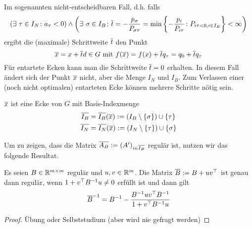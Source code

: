 Im sogenannten nicht-entscheidbaren Fall, d.h. falls
\begin{equation*}
	\left( \exists \ \tau \in I_N \colon a_\tau < 0 \right) \land \left(  \exists \ \sigma \in I_B \colon \overline{t} = -\frac{p_\sigma}{P_{\sigma \tau}} = \min \left\{ -\frac{p_i}{P_{i \tau}} \colon P_{i \tau < 0, i \in I_B} \right\} < \infty \right)
\end{equation*}
ergibt die (maximale) Schrittweite $\overline{t}$ den Punkt
\begin{equation*}
	\overline{x} = x + \overline{t} d \in G \text{ mit } f(\overline{x}) = f(x) + \overline{t} q_\tau = q_0 + \overline{t} q_\tau
\end{equation*}
Für entartete Ecken kann man die Schrittweite $\overline{t} = 0$ erhalten. In diesem Fall ändert sich der Punkt $\overline{x}$ nicht, aber die Menge $I_N$ und $I_B$. Zum Verlassen einer (noch nicht optimalen) entarteten Ecke können mehrere Schritte nötig sein. 

\begin{satz} %
	\label{satz: 3.6}
	$\overline{x}$ ist eine Ecke von $G$ mit Basis-Indexmenge
	\begin{equation*}
		\begin{aligned}
			\overline{I_B} &= \overline{I_B}(\overline{x}) \mathrel{:=} \left( I_B \setminus \left\{ \sigma \right\} \right) \cup \left\{ \tau \right\} \\
			\overline{I_N} &= \overline{I_N}(\overline{x}) \mathrel{:=} \left( I_N \setminus \left\{ \tau \right\} \right) \cup \left\{ \sigma \right\}
		\end{aligned}
	\end{equation*}
\end{satz}

Um zu zeigen, dass die Matrix $\overline{A_B} \mathrel{:=} (A')_{i \in \overline{I_B}}$ regulär ist, nutzen wir das folgende Resultat.

\begin{lemma} %
	\label{lemma: 3.7}
	Es seien $B \in \mathbb{R}^{m \times m}$ regulär und $u,v \in \mathbb{R}^m$. Die Matrix $\overline{B} \mathrel{:=} B + u v^{\top}$ ist genau dann regulär, wenn $1 + v^{\top} B^{-1} u \neq 0$ erfüllt ist und dann gilt
	\begin{equation*}
		\overline{B}^{-1} = B^{-1} - \frac{B^{-1} u v^{\top} B^{-1}}{1 + v^{\top} B^{-1} u}
	\end{equation*}
\end{lemma}
\begin{proof}
	Übung oder Selbststudium (aber wird nie gefragt werden)
\end{proof}

